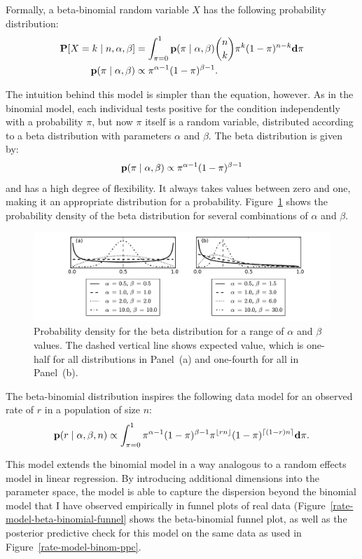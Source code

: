 Formally, a beta-binomial random variable $X$ has the following
probability distribution:
\begin{align*}
\mathbf{P}[X = k\;|\; n, \alpha, \beta]  &= \int_{\pi=0}^1 \mathbf{p}(\pi\;|\; \alpha, \beta) \binom{n}{k}\pi^k(1-\pi)^{n-k} \mathbf{d}\pi\\
\mathbf{p}(\pi\;|\; \alpha, \beta) &\propto \pi^{\alpha-1}(1-\pi)^{\beta-1}.
\end{align*}

The intuition behind this model is simpler than the equation,
however. As in the binomial model, each individual tests positive for
the condition independently with a probability $\pi$, but now $\pi$
itself is a random variable, distributed according to a beta
distribution with parameters $\alpha$ and $\beta$. The beta
distribution is given by:
\[
\mathbf{p}(\pi\;|\; \alpha, \beta)
\propto \pi^{\alpha-1}(1-\pi)^{\beta-1}
\]
and has a high degree of flexibility.  It always takes values
between zero and one, making it an appropriate distribution for a
probability.  Figure~\ref{rate-model-beta} shows the probability
density of the beta distribution for several combinations of $\alpha$
and $\beta$.
\begin{figure}[ht]
\begin{center}
\includegraphics[width=\textwidth]{beta-distribution.pdf}
\end{center}
\caption{Probability density for the beta distribution for a range of
  $\alpha$ and $\beta$ values. The dashed vertical line shows expected value,
  which is one-half for all distributions in Panel~(a) and
  one-fourth for all in Panel~(b).}
\label{rate-model-beta}
\end{figure}

The beta-binomial distribution inspires the following data model for
an observed rate of $r$ in a population of size $n$:
\[
\mathbf{p}(r\;|\; \alpha, \beta, n) \propto
\int_{\pi=0}^1 \pi^{\alpha-1}(1-\pi)^{\beta-1}
\pi^{\lfloor rn\rfloor} (1-\pi)^{\lceil (1-r)n\rceil} \mathbf{d}\pi.
\]

This model extends the binomial model in a way analogous to a random
effects model in linear regression.  By introducing additional
dimensions into the parameter space, the model is able to capture the
dispersion beyond the binomial model that I have observed empirically
in funnel plots of real data
(Figure~\ref{rate-model-beta-binomial-funnel} shows the beta-binomial funnel plot, as well as the posterior predictive check for
this model on the same data as used in
Figure~\ref{rate-model-binom-ppc}.

